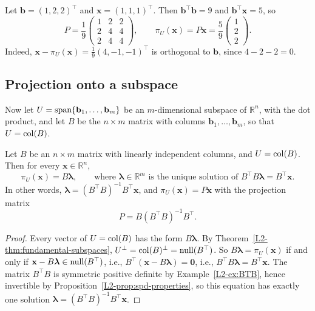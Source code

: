 \begin{example}
    Let $\mathbf{b} = (1, 2, 2)^\top$ and $\mathbf{x} = (1, 1, 1)^\top$. Then $\mathbf{b}^\top \mathbf{b} = 9$ and $\mathbf{b}^\top \mathbf{x} = 5$, so
    \[P = \frac{1}{9} \begin{pmatrix} 1 & 2 & 2 \\ 2 & 4 & 4 \\ 2 & 4 & 4 \end{pmatrix}, \qquad \pi_U(\mathbf{x}) = P\mathbf{x} = \frac{5}{9} \begin{pmatrix} 1 \\ 2 \\ 2 \end{pmatrix}.\]
    Indeed, $\mathbf{x} - \pi_U(\mathbf{x}) = \frac{1}{9}(4, -1, -1)^\top$ is orthogonal to $\mathbf{b}$, since $4 - 2 - 2 = 0$.
\end{example}

\subsection{Projection onto a subspace}

Now let $U = \operatorname{span}\{\mathbf{b}_1, \ldots, \mathbf{b}_m\}$ be an $m$-dimensional subspace of $\mathbb{R}^n$, with the dot product, and let $B$ be the $n \times m$ matrix with columns $\mathbf{b}_1, \ldots, \mathbf{b}_m$, so that $U = \operatorname{col}(B)$.

\begin{theorem}\label{L2-thm:projection-subspace}
    Let $B$ be an $n \times m$ matrix with linearly independent columns, and $U = \operatorname{col}(B)$. Then for every $\mathbf{x} \in \mathbb{R}^n$,
    \[\pi_U(\mathbf{x}) = B\boldsymbol{\lambda}, \qquad \text{where } \boldsymbol{\lambda} \in \mathbb{R}^m \text{ is the unique solution of } B^\top B \boldsymbol{\lambda} = B^\top \mathbf{x}.\]
    In other words, $\boldsymbol{\lambda} = (B^\top B)^{-1} B^\top \mathbf{x}$, and $\pi_U(\mathbf{x}) = P\mathbf{x}$ with the projection matrix
    \[P = B (B^\top B)^{-1} B^\top.\]
\end{theorem}

\begin{proof}
    Every vector of $U = \operatorname{col}(B)$ has the form $B\boldsymbol{\lambda}$. By Theorem~\ref{L2-thm:fundamental-subspaces}, $U^\perp = \operatorname{col}(B)^\perp = \operatorname{null}(B^\top)$. So $B\boldsymbol{\lambda} = \pi_U(\mathbf{x})$ if and only if $\mathbf{x} - B\boldsymbol{\lambda} \in \operatorname{null}(B^\top)$, i.e., $B^\top(\mathbf{x} - B\boldsymbol{\lambda}) = \mathbf{0}$, i.e., $B^\top B \boldsymbol{\lambda} = B^\top \mathbf{x}$. The matrix $B^\top B$ is symmetric positive definite by Example~\ref{L2-ex:BTB}, hence invertible by Proposition~\ref{L2-prop:spd-properties}, so this equation has exactly one solution $\boldsymbol{\lambda} = (B^\top B)^{-1} B^\top \mathbf{x}$.
\end{proof}

